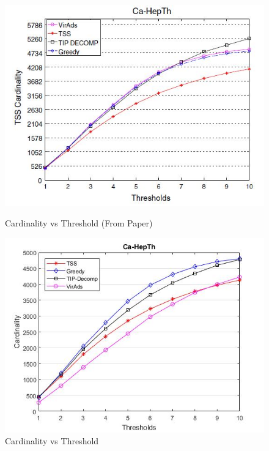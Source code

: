\begin{figure}[h!]
\begin{minipage}[t]{0.50\textwidth}
\includegraphics[width=\linewidth,keepaspectratio=true]{images/ca-hepthpaper.jpg}
\caption{Cardinality vs Threshold (From Paper)}

\end{minipage}
\begin{minipage}[t]{0.50\textwidth}
\includegraphics[width=\linewidth,keepaspectratio=true]{images/ca-hepthresult.jpg}
\caption{Cardinality vs Threshold}
\end{minipage}
\end{figure}


